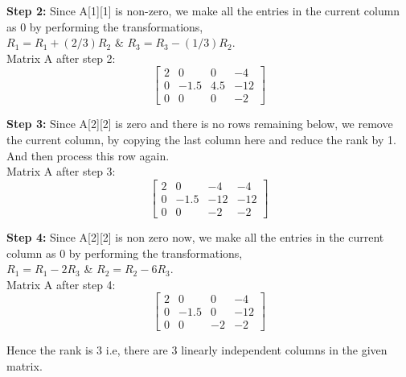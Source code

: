 \documentclass{beamer}
\begin{document}
\begin{frame}

\textbf{Step 2:} Since A[1][1] is non-zero, we make all the entries in the current column as 0 by performing the transformations,\\ $R_{1} = R_{1} + (2/3)R_{2}$ \& $R_{3} = R_{3} - (1/3)R_{2}$.\\
\vspace{10}
Matrix A after step 2:
\begin{equation}
     \begin{bmatrix}
    2 & 0 & 0 & -4\\
    0 & -1.5 & 4.5 & -12\\
    0 & 0 & 0 & -2
    \end{bmatrix}  
\end{equation}

\end{frame}

\begin{frame}

\textbf{Step 3:} Since A[2][2] is zero and there is no rows remaining below, we remove the current column, by copying the last column here and reduce the rank by 1. And then process this row again.\\
\vspace{10}
Matrix A after step 3:
\begin{equation}
     \begin{bmatrix}
    2 & 0 & -4 & -4\\
    0 & -1.5 & -12 & -12\\
    0 & 0 & -2 & -2
    \end{bmatrix}  
\end{equation}

\end{frame}

\begin{frame}

\textbf{Step 4:} Since A[2][2] is non zero  now, we make all the entries in the current column as 0 by performing the transformations,\\ $R_{1} = R_{1} - 2R_{3}$ \& $R_{2} = R_{2} - 6R_{3}$.\\
\vspace{10}
Matrix A after step 4:
\begin{equation}
     \begin{bmatrix}
    2 & 0 & 0 & -4\\
    0 & -1.5 & 0 & -12\\
    0 & 0 & -2 & -2
    \end{bmatrix}  
\end{equation}

Hence the rank is 3 i.e, there are 3 linearly independent columns in the given matrix.
\end{frame}
\end{document}
